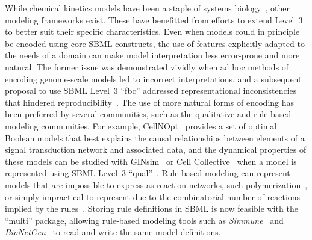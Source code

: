 \documentclass{sbml-paper}
\begin{document}
While chemical kinetics models have been a staple of systems biology~\citep{hubner2011applications}, other modeling frameworks exist.  These have benefitted from efforts to extend Level~3 to better suit their specific characteristics.  Even when models could in principle be encoded using core SBML constructs, the use of features explicitly adapted to the needs of a domain can make model interpretation less error-prone and more natural.  The former issue was demonstrated vividly when ad hoc methods of encoding genome-scale models led to incorrect interpretations, and a subsequent proposal to use SBML Level~3 ``fbc'' addressed representational inconsistencies that hindered reproducibility~\citep{Ebrahim2015}.  The use of more natural forms of encoding has been preferred by several communities, such as the qualitative and rule-based modeling communities.  For example, CellNOpt~\citep{terfve2012cellnoptr} provides a set of optimal Boolean models that best explains the causal relationships between elements of a signal transduction network and associated data, and the dynamical properties of these models can be studied with GINsim~\citep{chaouiya2012logical} or Cell Collective~\citep{helikar2012cell} when a model is represented using SBML Level~3 ``qual''~\citep{Chaouiya2015sbml}.  Rule-based modeling can represent models that are impossible to express as reaction networks, such polymerization~\citep{faeder2009rule}, or simply impractical to represent due to the combinatorial number of reactions implied by the rules~\citep{Hlavacek2003complexity}.  Storing rule definitions in SBML is now feasible with the ``multi'' package, allowing rule-based modeling tools such as \emph{Simmune}~\citep{zhang2013simmune} and \emph{BioNetGen}~\citep{faeder2009rule, Harris2016bionetgen} to read and write the same model definitions.  %
\end{document}
